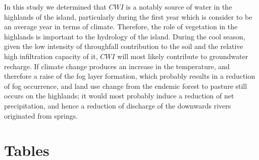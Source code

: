 \documentclass[a4paper,12pt]{article}
\begin{document}
\begin{linenumbers}
In this study we determined that $CWI$ is a notably source of water in the highlands of the island, particularly during the first year which is consider to be an average year in terms of climate. Therefore, the role of vegetation in the highlands is important to the hydrology of the island. During the cool season, given the low intensity of throughfall contribution to the soil and the relative high infiltration capacity of it, $CWI$ will most likely contribute to groundwater recharge. If climate change produces an increase in the temperature, and therefore a raise of the fog layer formation, which probably results in a reduction of fog occurrence, and land use change from the endemic forest to pasture still occurs on the highlands; it would most probably induce a reduction of net precipitation, and hence a reduction of discharge of the downwards rivers originated from springs.

\end{linenumbers}
\newpage





\newpage
\section{Tables}
\end{document}
